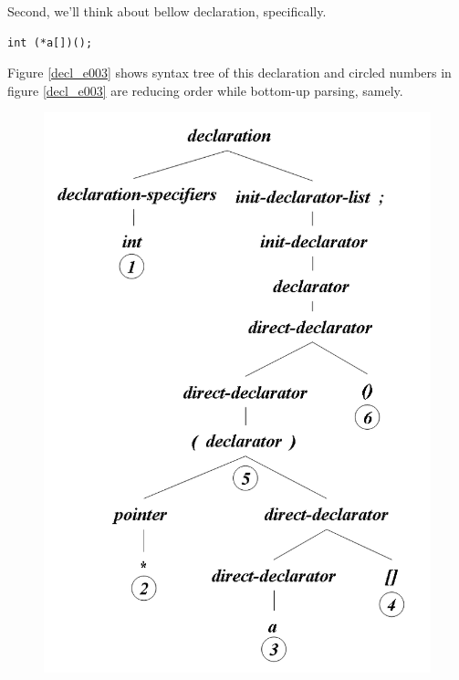 Second, we'll think about bellow declaration, specifically.
\begin{verbatim}
int (*a[])();
\end{verbatim}
Figure \ref{decl_e003} shows syntax tree of this declaration
and circled numbers in figure \ref{decl_e003} are reducing order
while bottom-up parsing, samely.
\begin{figure}[htbp]
\begin{center}
\begin{htmlonly}
\includegraphics[width=1.0125\linewidth,height=1.4175\linewidth]{decl003.png}
\end{htmlonly} 
\begin{latexonly}

\end{latexonly}
\end{center}
\end{figure}
